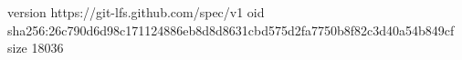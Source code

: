 version https://git-lfs.github.com/spec/v1
oid sha256:26c790d6d98c171124886eb8d8d8631cbd575d2fa7750b8f82c3d40a54b849cf
size 18036
